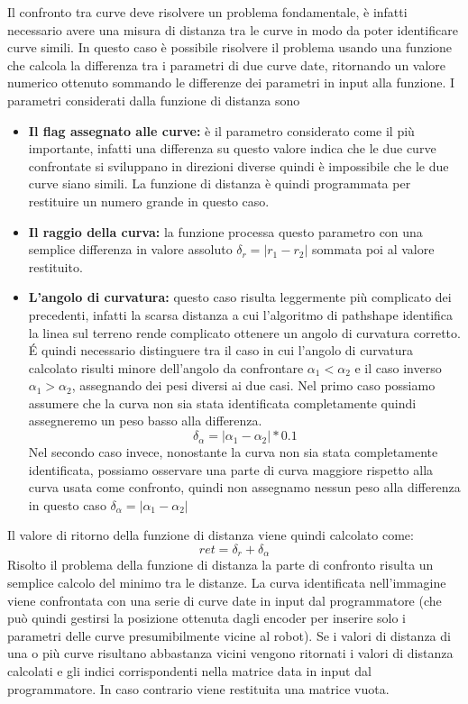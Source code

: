     Il confronto tra curve deve risolvere un problema fondamentale, è infatti necessario avere una misura di distanza tra le curve in modo da poter identificare curve simili. In questo caso è possibile risolvere il problema usando una funzione che calcola la differenza tra i parametri di due curve date, ritornando un valore numerico ottenuto sommando le differenze dei parametri in input alla funzione.
    I parametri considerati dalla funzione di distanza sono
    \begin{itemize}
        \item \textbf{Il flag assegnato alle curve:} è il parametro considerato come il più importante, infatti una differenza su questo valore indica che le due curve confrontate si sviluppano in direzioni diverse quindi è impossibile che le due curve siano simili. La funzione di distanza è quindi programmata per restituire un numero grande in questo caso.
        \item \textbf{Il raggio della curva:} la funzione processa questo parametro con una semplice differenza in valore assoluto $\delta_r = |r_1-r_2|$ sommata poi al valore restituito.
        \item \textbf{L'angolo di curvatura:} questo caso risulta leggermente più complicato dei precedenti, infatti la scarsa distanza a cui l'algoritmo di pathshape identifica la linea sul terreno rende complicato ottenere un angolo di curvatura corretto.
        \'E quindi necessario distinguere tra il caso in cui l'angolo di curvatura calcolato risulti minore dell'angolo da confrontare $\alpha_1<\alpha_2$ e il caso inverso $\alpha_1>\alpha_2$, assegnando dei pesi diversi ai due casi. Nel primo caso possiamo assumere che la curva non sia stata identificata completamente quindi assegneremo un peso basso alla differenza. $$\delta_{\alpha} = |\alpha_1-\alpha_2|*0.1$$    Nel secondo caso invece, nonostante la curva non sia stata completamente identificata, possiamo osservare una parte di curva maggiore rispetto alla curva usata come confronto, quindi non assegnamo nessun peso alla differenza in questo caso $\delta_{\alpha} = |\alpha_1-\alpha_2|$
    \end{itemize}
    Il valore di ritorno della funzione di distanza viene quindi calcolato come: $$ret = \delta_r+\delta_{\alpha}$$
    Risolto il problema della funzione di distanza la parte di confronto risulta un semplice calcolo del minimo tra le distanze. La curva identificata nell'immagine viene confrontata con una serie di curve date in input dal programmatore (che può quindi gestirsi la posizione ottenuta dagli encoder per inserire solo i parametri delle curve presumibilmente vicine al robot). Se i valori di distanza di una o più curve risultano abbastanza vicini vengono ritornati i valori di distanza calcolati e gli indici corrispondenti nella matrice data in input dal programmatore. In caso contrario viene restituita una matrice vuota.
